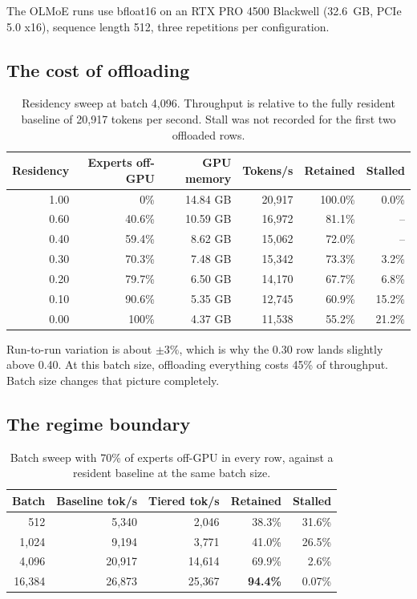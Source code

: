 \documentclass[10pt,a4paper]{article}
\begin{document}
The OLMoE runs use bfloat16 on an RTX PRO 4500 Blackwell (32.6~GB, PCIe 5.0 x16),
sequence length 512, three repetitions per configuration.

\subsection{The cost of offloading}

\begin{table}[htbp]
\centering\small
\caption{Residency sweep at batch 4{,}096. Throughput is relative to the fully
resident baseline of 20{,}917 tokens per second. Stall was not recorded for the
first two offloaded rows.}
\label{tab:residency}
\begin{tabular}{rrrrrr}
\toprule
Residency & Experts off-GPU & GPU memory & Tokens/s & Retained & Stalled \\
\midrule
1.00 & 0\%     & 14.84 GB & 20{,}917 & 100.0\% & 0.0\% \\
0.60 & 40.6\%  & 10.59 GB & 16{,}972 & 81.1\%  &  --   \\
0.40 & 59.4\%  &  8.62 GB & 15{,}062 & 72.0\%  &  --   \\
0.30 & 70.3\%  &  7.48 GB & 15{,}342 & 73.3\%  & 3.2\% \\
0.20 & 79.7\%  &  6.50 GB & 14{,}170 & 67.7\%  & 6.8\% \\
0.10 & 90.6\%  &  5.35 GB & 12{,}745 & 60.9\%  & 15.2\% \\
0.00 & 100\%   &  4.37 GB & 11{,}538 & 55.2\%  & 21.2\% \\
\bottomrule
\end{tabular}
\end{table}

Run-to-run variation is about $\pm 3\%$, which is why the 0.30 row lands slightly
above 0.40. At this batch size, offloading everything costs 45\% of throughput.
Batch size changes that picture completely.

\subsection{The regime boundary}

\begin{table}[htbp]
\centering\small
\caption{Batch sweep with 70\% of experts off-GPU in every row, against a resident
baseline at the same batch size.}
\label{tab:batch}
\begin{tabular}{rrrrr}
\toprule
Batch & Baseline tok/s & Tiered tok/s & Retained & Stalled \\
\midrule
512      &  5{,}340 &  2{,}046 & 38.3\% & 31.6\% \\
1{,}024  &  9{,}194 &  3{,}771 & 41.0\% & 26.5\% \\
4{,}096  & 20{,}917 & 14{,}614 & 69.9\% &  2.6\% \\
16{,}384 & 26{,}873 & 25{,}367 & \textbf{94.4\%} & 0.07\% \\
\bottomrule
\end{tabular}
\end{table}
\end{document}

